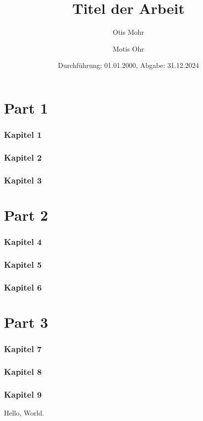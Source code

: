 \documentclass[a4paper, titlepage=firstiscover]{scrartcl}
\title{Titel der Arbeit}
\author{Otis Mohr \and Motis Ohr}
\date{Durchführung: 01.01.2000, Abgabe: 31.12.2024}
\begin{document}
\maketitle
\tableofcontents
\newpage

\part{Part 1}
\section{Kapitel 1}
\section{Kapitel 2}
\section{Kapitel 3}
\part{Part 2}
\section{Kapitel 4}
\section{Kapitel 5}
\section{Kapitel 6}
\part{Part 3}
\section{Kapitel 7}
\section{Kapitel 8}
\section{Kapitel 9}

Hello, World.
\end{document}
